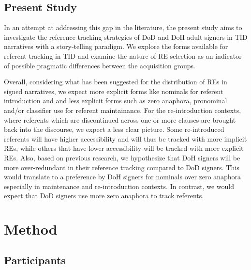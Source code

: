 \documentclass[]{elsarticle} %
\begin{document}
\hypertarget{present-study}{%
\subsection{Present Study}\label{present-study}}

In an attempt at addressing this gap in the literature, the present
study aims to investigate the reference tracking strategies of DoD and
DoH adult signers in TİD narratives with a story-telling paradigm. We
explore the forms available for referent tracking in TİD and examine the
nature of RE selection as an indicator of possible pragmatic differences
between the acquisition groups.

Overall, considering what has been suggested for the distribution of REs
in signed narratives, we expect more explicit forms like nominals for
referent introduction and and less explicit forms such as zero anaphora,
pronominal and/or classifier use for referent maintainance. For the
re-introduction contexts, where referents which are discontinued across
one or more clauses are brought back into the discourse, we expect a
less clear picture. Some re-introduced referents will have higher
accessibility and will thus be tracked with more implicit REs, while
others that have lower accessibility will be tracked with more explicit
REs. Also, based on previous research, we hypothesize that DoH signers
will be more over-redundant in their reference tracking compared to DoD
signers. This would translate to a preference by DoH signers for
nominals over zero anaphora especially in maintenance and
re-introduction contexts. In contrast, we would expect that DoD signers
use more zero anaphora to track referents.

\hypertarget{method}{%
\section{Method}\label{method}}

\hypertarget{participants}{%
\subsection{Participants}\label{participants}}
\end{document}
